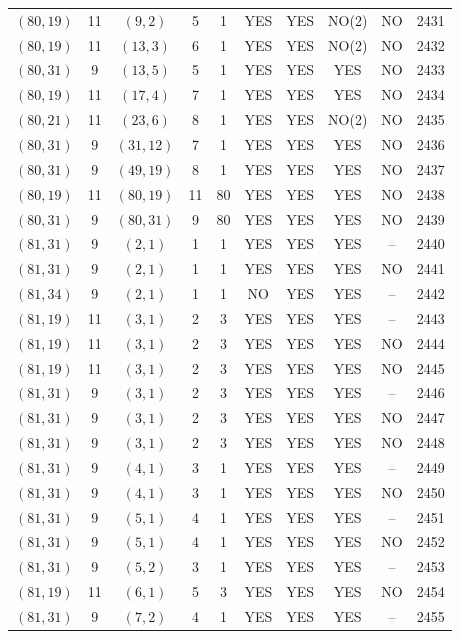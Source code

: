 \begin{longtable}{|c|c|c|c|c|c|c|c|c|c|}
$(80, 19)$ & 11 & $(9, 2)$ & 5 & 1 & YES & YES & NO(2) & NO & 2431\\
$(80, 19)$ & 11 & $(13, 3)$ & 6 & 1 & YES & YES & NO(2) & NO & 2432\\
$(80, 31)$ & 9 & $(13, 5)$ & 5 & 1 & YES & YES & YES & NO & 2433\\
$(80, 19)$ & 11 & $(17, 4)$ & 7 & 1 & YES & YES & YES & NO & 2434\\
$(80, 21)$ & 11 & $(23, 6)$ & 8 & 1 & YES & YES & NO(2) & NO & 2435\\
$(80, 31)$ & 9 & $(31, 12)$ & 7 & 1 & YES & YES & YES & NO & 2436\\
$(80, 31)$ & 9 & $(49, 19)$ & 8 & 1 & YES & YES & YES & NO & 2437\\
$(80, 19)$ & 11 & $(80, 19)$ & 11 & 80 & YES & YES & YES & NO & 2438\\
$(80, 31)$ & 9 & $(80, 31)$ & 9 & 80 & YES & YES & YES & NO & 2439\\
$(81, 31)$ & 9 & $(2, 1)$ & 1 & 1 & YES & YES & YES & -- & 2440\\
$(81, 31)$ & 9 & $(2, 1)$ & 1 & 1 & YES & YES & YES & NO & 2441\\
$(81, 34)$ & 9 & $(2, 1)$ & 1 & 1 & NO & YES & YES & -- & 2442\\
$(81, 19)$ & 11 & $(3, 1)$ & 2 & 3 & YES & YES & YES & -- & 2443\\
$(81, 19)$ & 11 & $(3, 1)$ & 2 & 3 & YES & YES & YES & NO & 2444\\
$(81, 19)$ & 11 & $(3, 1)$ & 2 & 3 & YES & YES & YES & NO & 2445\\
$(81, 31)$ & 9 & $(3, 1)$ & 2 & 3 & YES & YES & YES & -- & 2446\\
$(81, 31)$ & 9 & $(3, 1)$ & 2 & 3 & YES & YES & YES & NO & 2447\\
$(81, 31)$ & 9 & $(3, 1)$ & 2 & 3 & YES & YES & YES & NO & 2448\\
$(81, 31)$ & 9 & $(4, 1)$ & 3 & 1 & YES & YES & YES & -- & 2449\\
$(81, 31)$ & 9 & $(4, 1)$ & 3 & 1 & YES & YES & YES & NO & 2450\\
$(81, 31)$ & 9 & $(5, 1)$ & 4 & 1 & YES & YES & YES & -- & 2451\\
$(81, 31)$ & 9 & $(5, 1)$ & 4 & 1 & YES & YES & YES & NO & 2452\\
$(81, 31)$ & 9 & $(5, 2)$ & 3 & 1 & YES & YES & YES & -- & 2453\\
$(81, 19)$ & 11 & $(6, 1)$ & 5 & 3 & YES & YES & YES & NO & 2454\\
$(81, 31)$ & 9 & $(7, 2)$ & 4 & 1 & YES & YES & YES & -- & 2455\\

\end{longtable}
